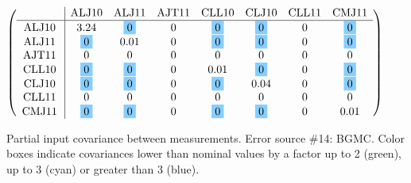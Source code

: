 \begin{table}[H]
\scriptsize
\begin{center}
\renewcommand{\arraystretch}{1.1}
\begin{math}\left(\begin{array}{c|ccccccc}
 & \mathrm{ALJ10} & 
\mathrm{ALJ11} & 
\mathrm{AJT11} & 
\mathrm{CLL10} & 
\mathrm{CLJ10} & 
\mathrm{CLL11} & 
\mathrm{CMJ11} \\
\hline
\mathrm{ALJ10} \hspace*{2pt} &       3.24 &  \colorbox{SkyBlue1}{$ 0$} &  0 &  \colorbox{SkyBlue1}{$ 0$} &  \colorbox{SkyBlue1}{$ 0$} &  0 &  \colorbox{SkyBlue1}{$ 0$} \\
\mathrm{ALJ11} \hspace*{2pt} &  \colorbox{SkyBlue1}{$ 0$} &       0.01 &  0 &  \colorbox{SkyBlue1}{$ 0$} &  \colorbox{SkyBlue1}{$ 0$} &  0 &  \colorbox{SkyBlue1}{$ 0$} \\
\mathrm{AJT11} \hspace*{2pt} &  0 &  0 &  0 &  0 &  0 &  0 &  0 \\
\mathrm{CLL10} \hspace*{2pt} &  \colorbox{SkyBlue1}{$ 0$} &  \colorbox{SkyBlue1}{$ 0$} &  0 &       0.01 &  \colorbox{SkyBlue1}{$ 0$} &  0 &  \colorbox{SkyBlue1}{$ 0$} \\
\mathrm{CLJ10} \hspace*{2pt} &  \colorbox{SkyBlue1}{$ 0$} &  \colorbox{SkyBlue1}{$ 0$} &  0 &  \colorbox{SkyBlue1}{$ 0$} &       0.04 &  0 &  \colorbox{SkyBlue1}{$ 0$} \\
\mathrm{CLL11} \hspace*{2pt} &  0 &  0 &  0 &  0 &  0 &  0 &  0 \\
\mathrm{CMJ11} \hspace*{2pt} &  \colorbox{SkyBlue1}{$ 0$} &  \colorbox{SkyBlue1}{$ 0$} &  0 &  \colorbox{SkyBlue1}{$ 0$} &  \colorbox{SkyBlue1}{$ 0$} &  0 &       0.01 \\
\end{array}\right)\end{math}
\caption{Partial input covariance between measurements. Error source \#14: BGMC. Color boxes indicate covariances lower than nominal values by a factor up to 2 (green), up to 3 (cyan) or greater than 3 (blue).}
\renewcommand{\arraystretch}{1}
\end{center}
\end{table}
